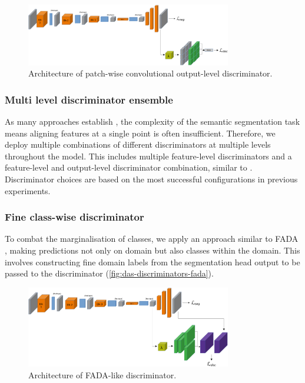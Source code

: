 \documentclass[a4paper,12pt]{report}
\begin{document}
\bigbreak
\begin{figure}[h]
    \centering
    \includegraphics[width=0.8\textwidth]{res/discriminator-diagrams/patch-convolutional-output.pdf}
    \caption{Architecture of patch-wise convolutional output-level discriminator.}
    \label{fig:das-discriminators-patch-conv-output}
\end{figure}

\subsubsection{Multi level discriminator ensemble}
As many approaches establish \cite{hoffman_fcns_2016} \cite{bermudez-chacon_domain-adaptive_2018}, the complexity of the semantic segmentation task means aligning features at a single point is often insufficient. Therefore, we deploy multiple combinations of different discriminators at multiple levels throughout the model. This includes multiple feature-level discriminators and a feature-level and output-level discriminator combination, similar to \cite{tsai_learning_2020}. Discriminator choices are based on the most successful configurations in previous experiments.

\subsubsection{Fine class-wise discriminator}
To combat the marginalisation of classes, we apply an approach similar to FADA \cite{wang_classes_2020}, making predictions not only on domain but also classes within the domain. This involves constructing fine domain labels from the segmentation head output to be passed to the discriminator (\autoref{fig:das-discriminators-fada}).

\bigbreak
\begin{figure}[h]
    \centering
    \includegraphics[width=0.8\textwidth]{res/discriminator-diagrams/fada.pdf}
    \caption{Architecture of FADA-like discriminator.}
    \label{fig:das-discriminators-fada}
\end{figure}
\end{document}
